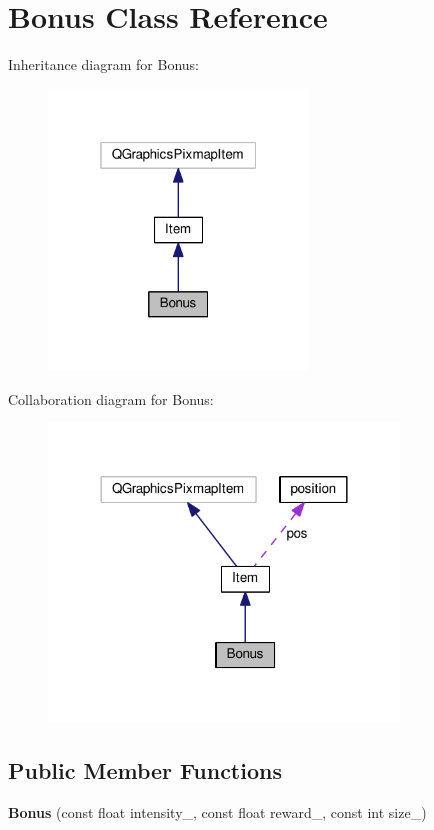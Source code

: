 \hypertarget{class_bonus}{}\section{Bonus Class Reference}
\label{class_bonus}


Inheritance diagram for Bonus\+:
\nopagebreak
\begin{figure}[H]
\begin{center}
\leavevmode
\includegraphics[width=196pt]{class_bonus__inherit__graph}
\end{center}
\end{figure}


Collaboration diagram for Bonus\+:
\nopagebreak
\begin{figure}[H]
\begin{center}
\leavevmode
\includegraphics[width=264pt]{class_bonus__coll__graph}
\end{center}
\end{figure}
\subsection*{Public Member Functions}
\begin{DoxyCompactItemize}
\item 
{\bfseries Bonus} (const float intensity\+\_\+, const float reward\+\_\+, const int size\+\_\+)\hypertarget{class_bonus_a151ace5d3747c97287fe7b338f14f3fb}{}\label{class_bonus_a151ace5d3747c97287fe7b338f14f3fb}

\end{DoxyCompactItemize}
